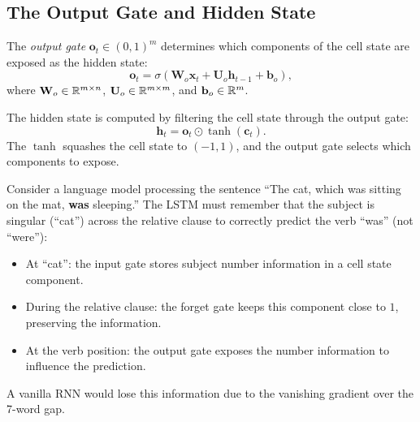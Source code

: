 \documentclass[11pt,a4paper]{article}
\begin{document}
\subsection{The Output Gate and Hidden State}

\begin{definition}
\label{def:output-gate}
The \emph{output gate} $\mathbf{o}_t \in (0, 1)^m$ determines which
components of the cell state are exposed as the hidden state:
\begin{equation}
  \boxed{\mathbf{o}_t = \sigma(\mathbf{W}_o \mathbf{x}_t +
    \mathbf{U}_o \mathbf{h}_{t-1} + \mathbf{b}_o)},
  \label{eq:output-gate}
\end{equation}
where $\mathbf{W}_o \in \mathbb{R}^{m \times n}$,
$\mathbf{U}_o \in \mathbb{R}^{m \times m}$, and
$\mathbf{b}_o \in \mathbb{R}^m$.
\end{definition}

\begin{definition}
\label{def:hidden-output}
The hidden state is computed by filtering the cell state through the
output gate:
\begin{equation}
  \boxed{\mathbf{h}_t = \mathbf{o}_t \odot \tanh(\mathbf{c}_t)}.
  \label{eq:hidden-output}
\end{equation}
The $\tanh$ squashes the cell state to $(-1, 1)$, and the output
gate selects which components to expose.
\end{definition}

\begin{example}
\label{ex:selective-memory}
Consider a language model processing the sentence ``The cat, which
was sitting on the mat, \textbf{was} sleeping.''  The LSTM must
remember that the subject is singular (``cat'') across the relative
clause to correctly predict the verb ``was'' (not ``were''):
\begin{itemize}[nosep]
  \item At ``cat'': the input gate stores subject number information
    in a cell state component.
  \item During the relative clause: the forget gate keeps this
    component close to $1$, preserving the information.
  \item At the verb position: the output gate exposes the number
    information to influence the prediction.
\end{itemize}
A vanilla RNN would lose this information due to the vanishing
gradient over the 7-word gap.
\end{example}
\end{document}
